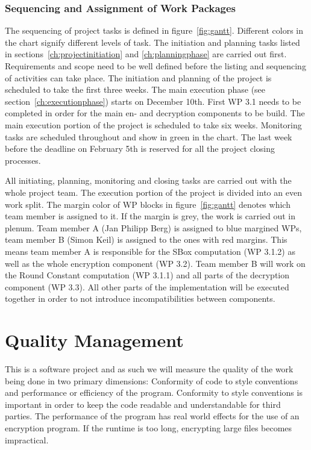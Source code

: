 \subsubsection{Sequencing and Assignment of Work Packages}
\label{ch:sequencingandassignment}

The sequencing of project tasks is defined in figure~\ref{fig:gantt}. Different colors in the chart signify different levels of task. The initiation and planning tasks listed in sections~\ref{ch:projectinitiation} and \ref{ch:planningphase} are carried out first. Requirements and scope need to be well defined before the listing and sequencing of activities can take place. The initiation and planning of the project is scheduled to take the first three weeks. The main execution phase (see section~\ref{ch:executionphase}) starts on December 10th. First \ac{WP} 3.1 needs to be completed in order for the main en- and decryption components to be build. The main execution portion of the project is scheduled to take six weeks. Monitoring tasks are scheduled throughout and show in green in the chart. The last week before the deadline on February 5th is reserved for all the project closing processes.

All initiating, planning, monitoring and closing tasks are carried out with the whole project team. The execution portion of the project is divided into an even work split. The margin color of \ac{WP} blocks in figure~\ref{fig:gantt} denotes which team member is assigned to it. If the margin is grey, the work is carried out in plenum. Team member A (Jan Philipp Berg) is assigned to blue margined \ac{WP}s, team member B (Simon Keil) is assigned to the ones with red margins. This means team member A is responsible for the SBox computation (\ac{WP} 3.1.2) as well as the whole encryption component (\ac{WP} 3.2). Team member B will work on the Round Constant computation (\ac{WP} 3.1.1) and all parts of the decryption component (\ac{WP} 3.3). All other parts of the implementation will be executed together in order to not introduce  incompatibilities between components.


\section{Quality Management}
\label{ch:qualitymanagement}
This is a software project and as such we will measure the quality of the work being done in two primary dimensions: Conformity of code to style conventions and performance or efficiency of the program. Conformity to style conventions is important in order to keep the code readable and understandable for third parties. The performance of the program has real world effects for the use of an encryption program. If the runtime is too long, encrypting large files becomes impractical.

